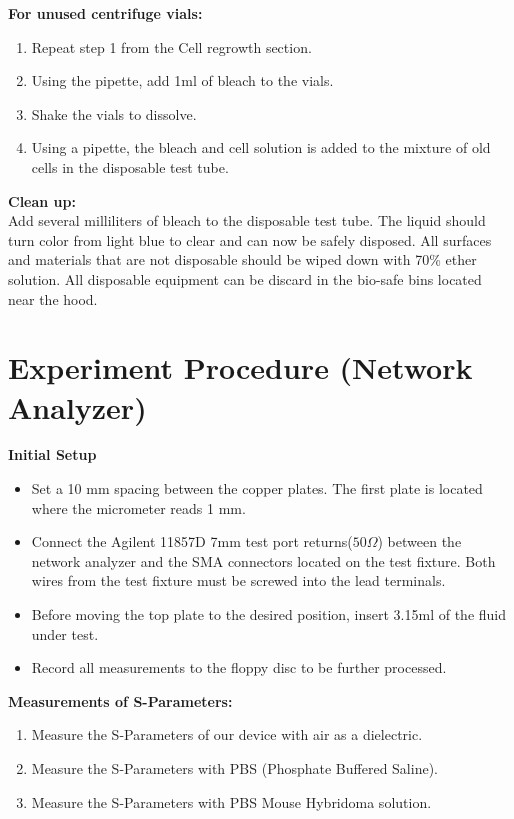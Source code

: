 \documentclass[journal]{IEEEtran}
\begin{document}
\textbf{For unused centrifuge vials:}
\begin{enumerate}
\item Repeat step 1 from the Cell regrowth section.
\item Using the pipette, add 1ml of bleach to the vials.
\item Shake the vials to dissolve.
\item Using a pipette, the bleach and cell solution is added to the mixture of old cells in the disposable test tube. 
\end{enumerate}

\textbf{Clean up:} \\
Add several milliliters of bleach to the disposable test tube. The liquid should turn color from light blue to clear and can now be safely disposed. All surfaces and materials that are not disposable should be wiped down with 70\% ether solution. All disposable equipment can be discard in the bio-safe bins located near the hood. 

\section{Experiment Procedure (Network Analyzer)}

\textbf{Initial Setup}
\begin{itemize}
	\item Set a 10 mm spacing between the copper plates. The first plate is located where the micrometer reads 1 mm.
	\item Connect the Agilent 11857D 7mm test port returns($50\Omega$) between the network analyzer and the SMA connectors located on the test fixture. Both wires from the test fixture must be screwed into the lead terminals.
	\item Before moving the top plate to the desired position, insert 3.15ml of the fluid under test.
	\item Record all measurements to the floppy disc to be further processed.
\end{itemize}

\textbf{Measurements of S-Parameters:}
\begin{enumerate}
	\item Measure the S-Parameters of our device with air as a dielectric.
	\item Measure the S-Parameters with PBS (Phosphate Buffered Saline).
	\item Measure the S-Parameters with PBS Mouse Hybridoma solution.
\end{enumerate}
\end{document}
